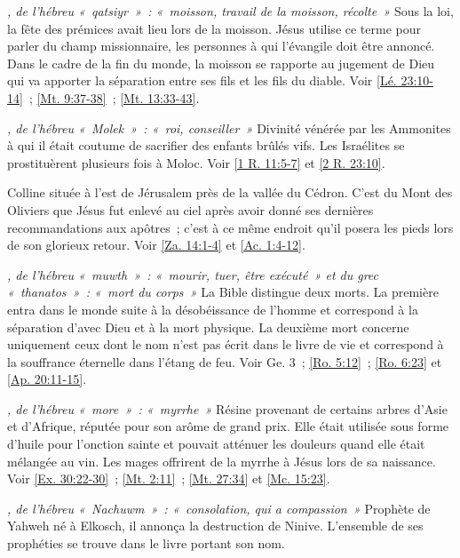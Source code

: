 \begin{multicols}{2}
\textit{, de l'hébreu «~qatsiyr~»~: «~moisson, travail de la moisson, récolte~»}\newline
Sous la loi, la fête des prémices avait lieu lors de la moisson. Jésus utilise ce terme pour parler du champ missionnaire, les personnes à qui l'évangile doit être annoncé. Dans le cadre de la fin du monde, la moisson se rapporte au jugement de Dieu qui va apporter la séparation entre ses fils et les fils du diable. Voir \vref{Lé. 23:10-14}~; \vref{Mt. 9:37-38}~; \vref{Mt. 13:33-43}.

\textit{, de l'hébreu «~Molek~»~: «~roi, conseiller~»}\newline
Divinité vénérée par les Ammonites à qui il était coutume de sacrifier des enfants brûlés vifs. Les Israélites se prostituèrent plusieurs fois à Moloc. Voir \vref{1 R. 11:5-7} et \vref{2 R. 23:10}.

\textit{}\newline
Colline située à l'est de Jérusalem près de la vallée du Cédron. C'est du Mont des Oliviers que Jésus fut enlevé au ciel après avoir donné ses dernières recommandations aux apôtres~; c'est à ce même endroit qu'il posera les pieds lors de son glorieux retour. Voir \vref{Za. 14:1-4} et \vref{Ac. 1:4-12}.

\textit{, de l'hébreu «~muwth~»~: «~mourir, tuer, être exécuté~» et du grec «~thanatos~»~: «~mort du corps~»}\newline
La Bible distingue deux morts. La première entra dans le monde suite à la désobéissance de l'homme et correspond à la séparation d'avec Dieu et à la mort physique. La deuxième mort concerne uniquement ceux dont le nom n'est pas écrit dans le livre de vie et correspond à la souffrance éternelle dans l'étang de feu. Voir Ge. 3~; \vref{Ro. 5:12}~; \vref{Ro. 6:23} et \vref{Ap. 20:11-15}.

\textit{, de l'hébreu «~more~»~: «~myrrhe~»}\newline
Résine provenant de certains arbres d'Asie et d'Afrique, réputée pour son arôme de grand prix. Elle était utilisée sous forme d'huile pour l'onction sainte et pouvait atténuer les douleurs quand elle était mélangée au vin. Les mages offrirent de la myrrhe à Jésus lors de sa naissance. Voir \vref{Ex. 30:22-30}~; \vref{Mt. 2:11}~; \vref{Mt. 27:34} et \vref{Mc. 15:23}.

\textit{, de l'hébreu «~Nachuwm~»~: «~consolation, qui a compassion~»}\newline
Prophète de Yahweh né à Elkosch, il annonça la destruction de Ninive. L'ensemble de ses prophéties se trouve dans le livre portant son nom.


\end{multicols}
